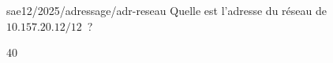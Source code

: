 \begin{question}{sae12/2025/adressage/adr-reseau}
  Quelle est l'adresse du réseau de $10.157.20.12/12$~?
  \begin{reponses}{4}{0}
  \end{reponses}
\end{question}
